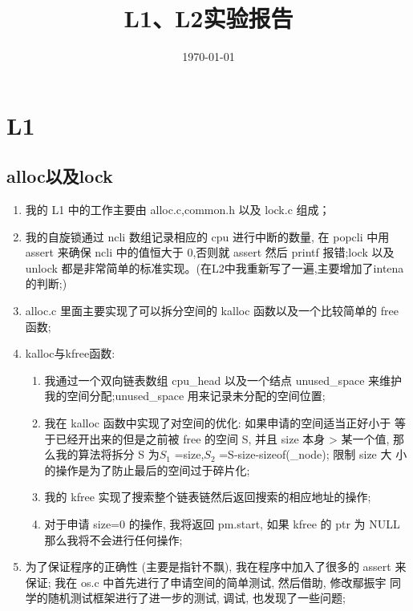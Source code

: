 \documentclass[11pt, a4paper, UTF8]{ctexart}
\title{L1、L2实验报告}
\date{\today}
\begin{document}
\maketitle

\beginthishw
\section{L1}
\subsection{alloc以及lock}
\begin{enumerate}
\item 我的 L1 中的工作主要由 alloc.c,common.h 以及 lock.c 组成；
\item 我的自旋锁通过 ncli 数组记录相应的 cpu 进行中断的数量, 在 popcli 中用
assert 来确保 ncli 中的值恒大于 0,否则就 assert 然后 printf 报错;lock 以及
unlock 都是非常简单的标准实现。(在L2中我重新写了一遍,主要增加了intena的判断;)
\item alloc.c 里面主要实现了可以拆分空间的 kalloc 函数以及一个比较简单的 free
函数;
\item kalloc与kfree函数:
\begin{enumerate}
    \item 我通过一个双向链表数组 cpu\_head 以及一个结点 unused\_space 来维护
    我的空间分配;unused\_space 用来记录未分配的空间位置;
    \item 我在 kalloc 函数中实现了对空间的优化: 如果申请的空间适当正好小于
    等于已经开出来的但是之前被 free 的空间 S, 并且 size 本身 > 某一个值,
    那么我的算法将拆分 S 为$ S _1$ =size,$S _2$ =S-size-sizeof(\_node); 限制 size 大
    小的操作是为了防止最后的空间过于碎片化;
    \item 我的 kfree 实现了搜索整个链表链然后返回搜索的相应地址的操作;
    \item 对于申请 size=0 的操作, 我将返回 pm.start, 如果 kfree 的 ptr 为 NULL
    那么我将不会进行任何操作;
\end{enumerate}
\item 为了保证程序的正确性 (主要是指针不飘), 我在程序中加入了很多的 assert
来保证; 我在 os.c 中首先进行了申请空间的简单测试, 然后借助, 修改鄢振宇
同学的随机测试框架进行了进一步的测试, 调试, 也发现了一些问题;

\end{enumerate}
\end{document}

